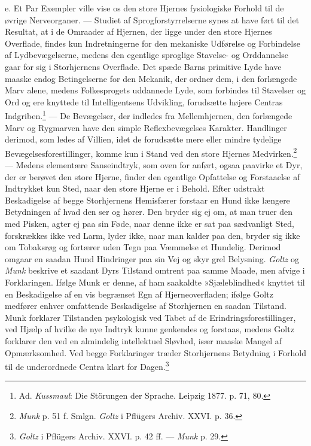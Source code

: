 \documentclass[12pt,a4paper,openany]{book}
\newcommand{\opage}[1]{\marginnote{\footnotesize\textit{[#1]}}}
\begin{document}
e. Et Par Exempler ville vise os den store Hjernes fysiologiske Forhold
til de øvrige Nerveorganer. --- Studiet af Sprogforstyrrelserne synes at
have ført til det Resultat, at i de Omraader af Hjernen, der ligge under
den store Hjernes Overflade, findes kun Indretningerne for den mekaniske
Udførelse og Forbindelse af Lydbevægelserne, medens den egentlige
sproglige Stavelse- og Orddannelse gaar for sig i Storhjernens
Overflade. Det spæde Barns primitive Lyde have maaske endog
Betingelserne for den Mekanik, der ordner dem, i den forlængede Marv
alene, medens Folkesprogets uddannede Lyde, som forbindes til Stavelser
og Ord og ere knyttede til Intelligentsens Udvikling, forudsætte højere
Centras Indgriben.\footnote[2]{Ad. \emph{Kussmaul}: Die Störungen der
Sprache. Leipzig 1877. p. 71, 80.} --- De Bevægelser, der indledes fra
Mellemhjernen, den forlængede Marv og Rygmarven have den simple
Reflexbevægelses Karakter. Handlinger derimod, som ledes af Villien,
idet de forudsætte mere eller mindre tydelige Bevægelsesforestillinger,
komme kun i Stand ved den store Hjernes
Medvirken.\footnote[3]{\emph{Munk} p. 51 f. Smlgn. \emph{Goltz} i
Pflügers Archiv. XXVI. p. 36.} --- Medens elementære Sanseindtryk, som
oven for anført, ogsaa paavirke et Dyr, der er berøvet den store Hjerne,
finder den egentlige Opfattelse og Forstaaelse af Indtrykket kun Sted,
naar den store Hjerne er i Behold. Efter udstrakt Beskadigelse af begge
Storhjernens Hemisfærer forstaar en Hund ikke længere Betydningen af
hvad den ser og hører. Den bryder sig ej om, at man truer den med
Pisken, agter ej paa sin Føde, naar denne ikke er sat paa sædvanligt
Sted, forskrækkes ikke ved Larm, lyder ikke, naar man kalder paa den,
bryder sig ikke om Tobaksrøg og fortærer uden Tegn paa Væmmelse et
Hundelig.
\opage{52}Derimod omgaar en saadan Hund Hindringer paa sin Vej og skyr
grel Belysning. \emph{Goltz} og \emph{Munk} beskrive et saadant Dyrs
Tilstand omtrent paa samme Maade, men afvige i Forklaringen. Ifølge Munk
er denne, af ham saakaldte »Sjæleblindhed« knyttet til en Beskadigelse
af en vis begrænset Egn af Hjerneoverfladen; ifølge Goltz medfører
enhver omfattende Beskadigelse af Storhjernen en saadan Tilstand. Munk
forklarer Tilstanden psykologisk ved Tabet af de
Erindringsforestillinger, ved Hjælp af hvilke de nye Indtryk kunne
genkendes og forstaas, medens Goltz forklarer den ved en almindelig
intellektuel Sløvhed, især maaske Mangel af Opmærksomhed. Ved begge
Forklaringer træder Storhjernens Betydning i Forhold til de underordnede
Centra klart for Dagen.\footnote[1]{\emph{Goltz} i Pflügers Archiv. XXVI. p. 42 ff. --- \emph{Munk} p. 29.}
\end{document}
